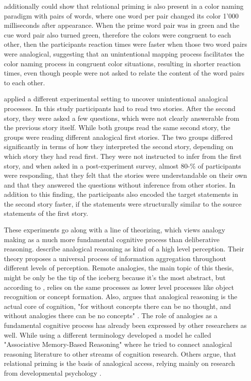 \documentclass[a4paper,man,natbib,floatsintext,import]{apa6}
\begin{document}
\cite{Hristova2009b} additionally could show that relational priming is also present in a color naming paradigm with pairs of words, where one word per pair changed its color 1'000 milliseconds after appearance. When the prime word pair was in green and the cue word pair also turned green, therefore the colors were congruent to each other, then the participants reaction times were faster when those two word pairs were analogical, suggesting that an unintentional mapping process facilitates the color naming process in congruent color situations, resulting in shorter reaction times, even though people were not asked to relate the content of the word pairs to each other.

\cite{Day2007} applied a different experimental setting to uncover unintentional analogical processes. In this study participants had to read two stories. After the second story, they were asked a few questions, which were not clearly answerable from the previous story itself. While both groups read the same second story, the groups were reading different analogical first stories. The two groups differed significantly in terms of how they interpreted the second story, depending on which story they had read first. They were not instructed to infer from the first story, and when asked in a post-experiment survey, almost 80-\% of participants were responding, that they felt that the stories were understandable on their own and that they answered the questions without inference from other stories. In addition to this finding, the participants also encoded the target statements in the second story faster, if the statements were structurally similar to the source statements of the first story.

These experiments go along with a line of theorizing, which views analogy making as a much more fundamental cognitive process than deliberative reasoning. \cite{Chalmers1992} describe analogical reasoning as kind of a high level perception. Their theory proposes a universal process of information aggregation throughout different levels of perception. Remote analogies, the main topic of this thesis, might be only be the tip of the iceberg because it's the most abstract, but according to \cite{Chalmers1992}, relies on the same processes as lower level processes like object recognition or concept formation. Also, \cite{Hofstadter2001} argues that analogical reasoning is the actual core of cognition, "for without concepts there can be no thought, and without analogies there can be no concepts" \citep[p. 34]{Hofstadter2013}. The role of analogies as a fundamental cognitive process has already been expressed by other researchers as well. While using a different terminology \cite{Kokinov1994} developed a model he called "Associative Memory-Based Reasoning" where he tried to connect analogical reasoning literature to other streams of cognition research. Others argue, that relational priming is the basis of analogical access, relying mainly on research from developmental psychology \citep{Leech2008}.
\end{document}
